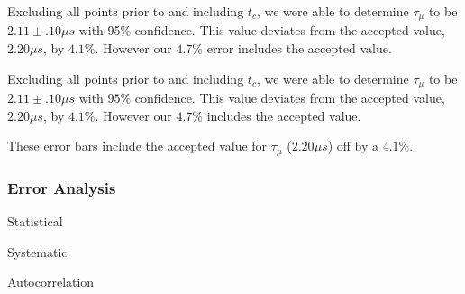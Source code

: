 Excluding all points prior to and including $t_{c}$, we were able to determine $\tau_{\mu}$ to be $2.11 \pm .10 \mu s$ with 95\% confidence.  This value deviates from the accepted value, $2.20\mu s$, by $4.1\%$.  However our $4.7\%$ error includes the accepted value.

Excluding all points prior to and including $t_{c}$, we were able to
determine $\tau_{\mu}$ to be $2.11 \pm .10 \mu s$ with $95\%$
confidence.  This value deviates from the accepted value, $2.20\mu s$,
by $4.1\%$.  However our $4.7\%$ includes the accepted value.

These error bars include the accepted value for $\tau_{\mu}$ ($2.20\mu s$) off by a $4.1\%$.

\subsubsection{Error Analysis}

Statistical

Systematic

Autocorrelation

